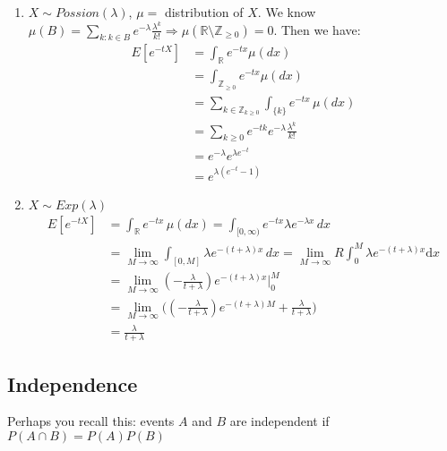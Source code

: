 \documentclass[11pt]{article}
\begin{document}
\begin{example}
    \begin{enumerate}
        \item $X \sim Possion(\lambda)$, $\mu = $ distribution of $X$.
        We know $\mu(B) = \sum_{k: k\in B} e^{-\lambda} \frac{\lambda^k}{k!} \Longrightarrow
        \mu(\mathbb{R} \setminus{\mathbb{Z}_{\ge 0}})= 0$. Then we have:
        \begin{align*}
            E[e^{-tX}] &= \int_{\mathbb{R}} e^{-tx} \mu(dx)\\
            &=\int_{\mathbb{Z}_{\ge 0}} e^{-tx} \mu(dx) \\
            &= \sum_{k \in \mathbb{Z}_{k\ge 0}} \int_{\{k\}} e^{-tx} \, \mu(dx)\\
            &= \sum_{k \ge 0} e^{-tk} e^{-\lambda} \frac{\lambda^k}{k!}\\
            &= e^{-\lambda} e^{\lambda e^{-t}} \\
            &= e^{\lambda(e^{-t}-1)}
        \end{align*}
        \item $X \sim Exp(\lambda)$
        \begin{align*}
            E[e^{-tX}] &= \int_{\mathbb{R}} e^{-tx} \, \mu(dx) = \int_{[0, \infty)} e^{-tx} \lambda e^{-\lambda x} \, dx \\
            &= \lim_{M \to \infty} \int_{[0,M]} \lambda e^{-(t+\lambda)x} \, dx = \lim_{M \to \infty}
            R \int_{0}^{M} \lambda e^{-(t+\lambda)x} \mathrm{d}x\\
            &= \lim_{M \to \infty} (-\frac{\lambda}{t+\lambda}) e^{-(t+\lambda)x} |^M_{0} \\
            &= \lim_{M \to \infty} \Big( (-\frac{\lambda}{t+\lambda}) e^{-(t+\lambda)M} + \frac{\lambda}{t+\lambda} \Big)\\
            &= \frac{\lambda}{t+\lambda}
        \end{align*}
    \end{enumerate}
\end{example}

\subsection{Independence}

Perhaps you recall this: events $A$ and $B$ are independent if $P(A \cap B) = P(A)P(B)$
\end{document}
